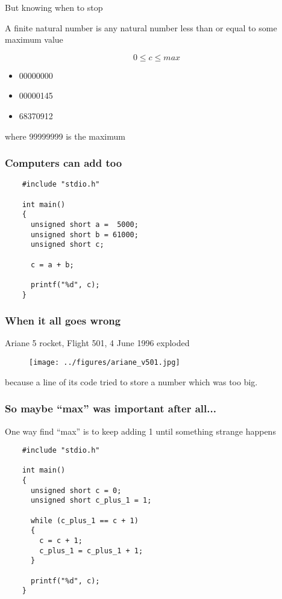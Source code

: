 \documentclass[xcolor=dvipsnames]{beamer}
\begin{document}
\begin{frame}{But knowing when to stop}
  \begin{definition}
    A finite natural number is any natural number less than or equal to some maximum value
  \end{definition}\pause

  \begin{equation*}
    0 \le c \le max
  \end{equation*}\pause

  \begin{example}
    \begin{itemize}
    \item 00000000
    \item 00000145
    \item 68370912
    \end{itemize}
    where 99999999 is the maximum
  \end{example}
\end{frame}


\begin{frame}[fragile]
  \frametitle{Computers can add too}
  \begin{lstlisting}
    #include "stdio.h"

    int main()
    {
      unsigned short a =  5000;
      unsigned short b = 61000;
      unsigned short c;

      c = a + b;

      printf("%d", c);
    }
  \end{lstlisting}
\end{frame}


\begin{frame}[fragile]
  \frametitle{When it all goes wrong}
  Ariane 5 rocket, Flight 501, 4 June 1996 exploded
  \begin{figure}
    \centering
    \texttt{[image: ../figures/ariane\_v501.jpg]}
  \end{figure}
  because a line of its code tried to store a number which was too big.
\end{frame}


\begin{frame}[fragile]
  \frametitle{So maybe ``max'' was important after all...}
  One way find ``max'' is to keep adding 1 until something strange happens
  \vspace{5mm}
  \begin{lstlisting}
    #include "stdio.h"

    int main()
    {
      unsigned short c = 0;
      unsigned short c_plus_1 = 1;

      while (c_plus_1 == c + 1)
      {
        c = c + 1;
        c_plus_1 = c_plus_1 + 1;
      }

      printf("%d", c);
    }
  \end{lstlisting}
\end{frame}
\end{document}

